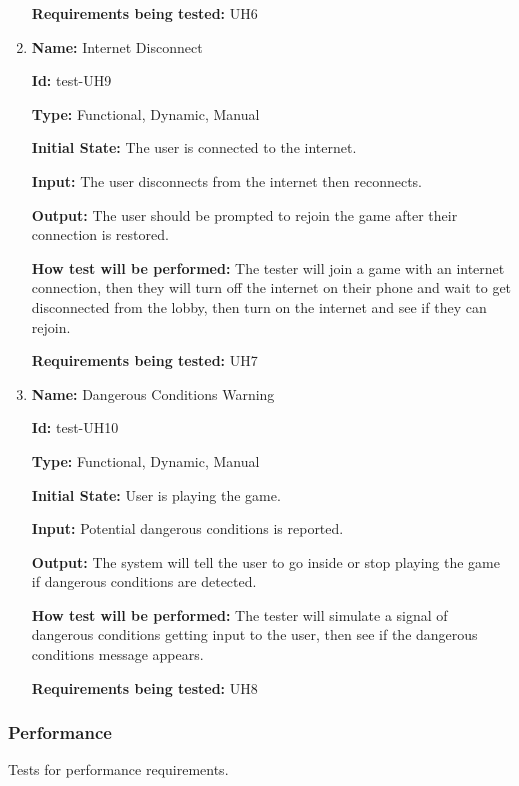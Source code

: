 \documentclass[12pt, titlepage]{article}
\begin{document}
\begin{enumerate}
\textbf{Requirements being tested:} UH6

\item{\textbf{Name: }Internet Disconnect }

\textbf{Id:} test-UH9

\textbf{Type:} Functional, Dynamic, Manual
					
\textbf{Initial State:} The user is connected to the internet.
					
\textbf{Input:} The user disconnects from the internet then reconnects.
					
\textbf{Output:} The user should be prompted to rejoin the game after their connection is restored.
					
\textbf{How test will be performed:} The tester will join a game with an internet connection, then they will turn off the internet on their phone and wait to get disconnected from the lobby, then turn on the internet and see if they can rejoin.

\textbf{Requirements being tested:} UH7

\item{\textbf{Name: }Dangerous Conditions Warning }

\textbf{Id:} test-UH10

\textbf{Type:} Functional, Dynamic, Manual
					
\textbf{Initial State:} User is playing the game.
					
\textbf{Input:} Potential dangerous conditions is reported.
					
\textbf{Output:} The system will tell the user to go inside or stop playing the game if dangerous conditions are detected.
					
\textbf{How test will be performed:} The tester will simulate a signal of dangerous conditions getting input to the user, then see if the dangerous conditions message appears.

\textbf{Requirements being tested:} UH8

\end{enumerate}

\subsubsection{Performance}
Tests for performance requirements.
\end{document}
